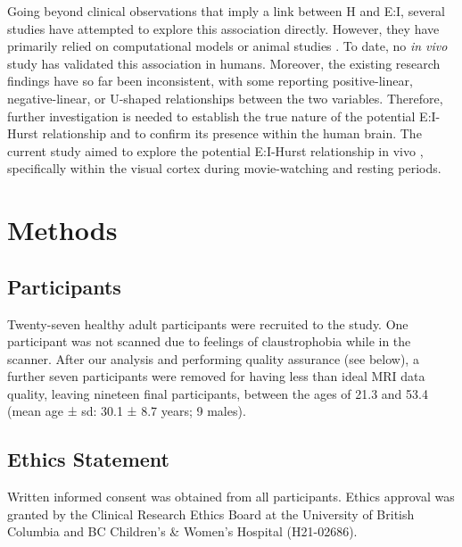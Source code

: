 \documentclass[
true
]{sn-jnl}
\begin{document}
Going beyond clinical observations that imply a link between H and E:I,
several studies have attempted to explore this association directly.
However, they have primarily relied on computational models or animal
studies
\citep{liangExcitationInhibitionBalance2024, poilCriticalStateDynamicsAvalanches2012, lombardiBalanceExcitationInhibition2017, baumgartenCriticalExcitationinhibitionBalance2019, bruiningMeasurementExcitationinhibitionRatio2020, trakoshisIntrinsicExcitationinhibitionImbalance, gaoInferringSynapticExcitation2017}.
To date, no \emph{in vivo} study has validated this association in
humans. Moreover, the existing research findings have so far been
inconsistent, with some reporting positive-linear, negative-linear, or
U-shaped relationships between the two variables. Therefore, further
investigation is needed to establish the true nature of the potential
E:I-Hurst relationship and to confirm its presence within the human
brain. The current study aimed to explore the potential E:I-Hurst
relationship in vivo , specifically within the visual cortex during
movie-watching and resting periods.

\section{Methods}\label{methods}

\subsection{Participants}\label{participants}

Twenty-seven healthy adult participants were recruited to the study. One
participant was not scanned due to feelings of claustrophobia while in
the scanner. After our analysis and performing quality assurance (see
below), a further seven participants were removed for having less than
ideal MRI data quality, leaving nineteen final participants, between the
ages of 21.3 and 53.4 (mean age ± sd: 30.1 ± 8.7 years; 9 males).

\subsection{Ethics Statement}\label{ethics-statement}

Written informed consent was obtained from all participants. Ethics
approval was granted by the Clinical Research Ethics Board at the
University of British Columbia and BC Children's \& Women's Hospital
(H21-02686).
\end{document}

